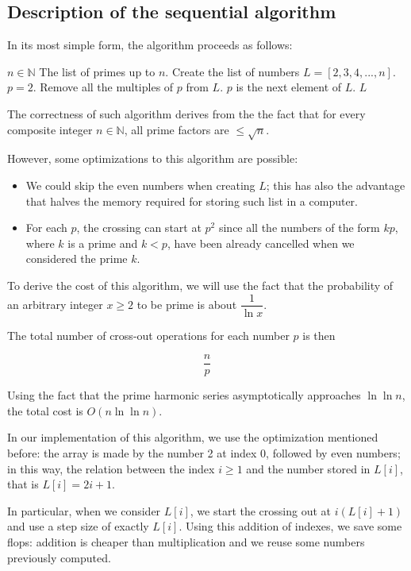 \documentclass[a4paper,11pt]{article}
\newcommand{\N}{\mathbb{N}}
\begin{document}
\subsection{Description of the sequential algorithm}

In its most simple form, the algorithm proceeds as follows:

\begin{algorithm}
\begin{algorithmic}
\REQUIRE $n \in \N$
\ENSURE The list of primes up to $n$.
\STATE
\STATE Create the list of numbers $L=[2,3,4,...,n]$.
\STATE $p=2$.
\STATE Remove all the multiples of $p$ from $L$.
\STATE $p$ is the next element of $L$.
\ENDWHILE
\RETURN $L$
\end{algorithmic}
\end{algorithm}

The correctness of such algorithm derives from the the fact that for every composite integer $n \in \N$, all prime factors are $\leq \sqrt{n}$.

However, some optimizations to this algorithm are possible:

\begin{itemize}
\item We could skip the even numbers when creating $L$; this has also the advantage that halves the memory required for storing such list in a computer.
\item For each $p$, the crossing can start at $p^2$ since all the numbers of the form $kp$, where $k$ is a prime and $k<p$, have been already cancelled when we considered the prime $k$.
\end{itemize}

To derive the cost of this algorithm, we will use the fact that the probability of an arbitrary integer $x \geq 2$ to be prime is about $\dfrac{1}{\ln x}$.

The total number of cross-out operations for each number $p$ is then

$$ \dfrac{n}{p}$$

Using the fact that the prime harmonic series asymptotically approaches $\ln \ln n$, the total cost is $O(n \ln \ln n)$.

In our implementation of this algorithm, we use the optimization mentioned before: the array is made by the number 2 at index 0, followed by even numbers; in this way, the relation between the index $i \geq 1$ and the number stored in $L[i]$, that is $L[i] = 2i+1$.

In particular, when we consider $L[i]$, we start the crossing out at $i(L[i]+1)$ and use a step size of exactly $L[i]$. Using this addition of indexes, we save some flops: addition is cheaper than multiplication and we reuse some numbers previously computed.
\end{document}
